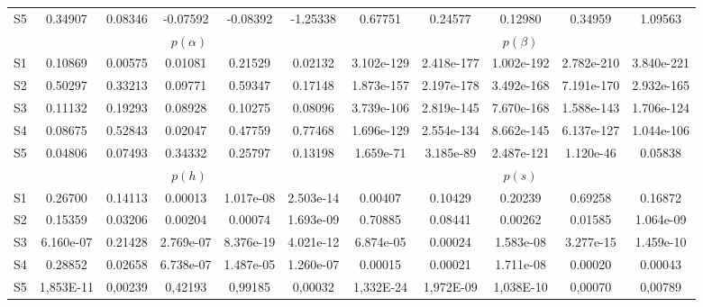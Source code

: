 \documentclass[a4paper,12pt]{article} %
\begin{document}
\begin{landscape}
\begin{table}
\begin{longtable}{c|ccccc|ccccc|}
				S5& 0.34907 &  0.08346 & -0.07592 & -0.08392 &  -1.25338 &   0.67751 &   0.24577 &  0.12980 &    0.34959 &    1.09563
				\vspace{0.3cm}\\
				& \multicolumn{5}{c|}{$p(\alpha)$} & \multicolumn{5}{c|}{$p(\beta)$}\\
				\hline
				S1& 0.10869 &  0.00575 &  0.01081 &  0.21529 &  0.02132 &  3.102e-129 &  2.418e-177 &  1.002e-192 &  2.782e-210 &  3.840e-221\\
				S2& 0.50297 &    0.33213 &  0.09771 &  0.59347 &   0.17148 &  1.873e-157 &  2.197e-178 &  3.492e-168 &  7.191e-170 &  2.932e-165\\
				S3& 0.11132 &    0.19293 &  0.08928 &  0.10275 &  0.08096 &  3.739e-106 &  2.819e-145 &  7.670e-168 &  1.588e-143 &   1.706e-124\\
				S4& 0.08675 &     0.52843 &  0.02047 &  0.47759 &   0.77468 &  1.696e-129 &  2.554e-134 &  8.662e-145 &   6.137e-127 &  1.044e-106\\
				S5& 0.04806 &   0.07493 &   0.34332 &  0.25797 &    0.13198 &   1.659e-71 &   3.185e-89 &   2.487e-121 &   1.120e-46 &     0.05838
				\vspace{0.3cm}\\
				& \multicolumn{5}{c|}{$p(h)$} & \multicolumn{5}{c|}{$p(s)$}\\
				\hline
				S1& 0.26700 &   0.14113 &  0.00013 &  1.017e-08 &  2.503e-14 &   0.00407 &     0.10429 &     0.20239 &     0.69258 &     0.16872\\
				S2& 0.15359 &  0.03206 &   0.00204 &  0.00074 &  1.693e-09 &     0.70885 &    0.08441 &   0.00262 &    0.01585 &  1.064e-09\\
				S3& 6.160e-07 &   0.21428 &  2.769e-07 &  8.376e-19 &  4.021e-12 &  6.874e-05 &  0.00024 &  1.583e-08 &  3.277e-15 &  1.459e-10\\
				S4& 0.28852 &  0.02658 &  6.738e-07 &  1.487e-05 &  1.260e-07 &  0.00015 &  0.00021 &  1.711e-08 &  0.00020 &  0.00043\\
				S5& 1,853E-11& 	0,00239&	0,42193&	0,99185&	0,00032&	1,332E-24&	
				1,972E-09&	1,038E-10&	0,00070&	0,00789\\
			\end{longtable}
		\end{table}
	\end{landscape}
	\newpage
	\linespread{1}
\end{document}
